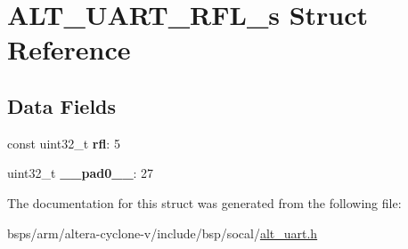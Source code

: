 \hypertarget{structALT__UART__RFL__s}{}\section{A\+L\+T\+\_\+\+U\+A\+R\+T\+\_\+\+R\+F\+L\+\_\+s Struct Reference}
\label{structALT__UART__RFL__s}
\subsection*{Data Fields}
\begin{DoxyCompactItemize}
\item 
\mbox{\label{structALT__UART__RFL__s_a3e814e617357ddaffa215041b1b33976}} 
const uint32\+\_\+t {\bfseries rfl}\+: 5
\item 
\mbox{\label{structALT__UART__RFL__s_ae68a57ded5344192f87e964569a269cb}} 
uint32\+\_\+t {\bfseries \+\_\+\+\_\+pad0\+\_\+\+\_\+}\+: 27
\end{DoxyCompactItemize}


The documentation for this struct was generated from the following file\+:\begin{DoxyCompactItemize}
\item 
bsps/arm/altera-\/cyclone-\/v/include/bsp/socal/\mbox{\hyperlink{alt__uart_8h}{alt\+\_\+uart.\+h}}\end{DoxyCompactItemize}
